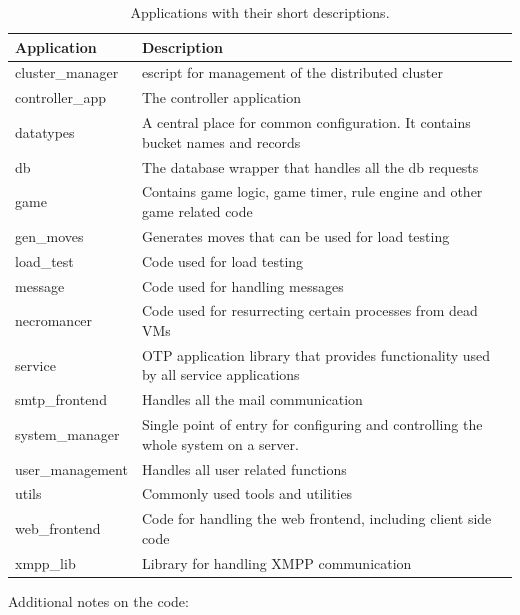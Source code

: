 \documentclass[11pt,a4paper]{report}
\begin{document}
\begin{center}
    \begin{table}[t]
    \centering
    \begin{tabular}{ | l |p{10cm}|}
    \hline
    \textbf{Application} & \textbf{Description} \\ \hline \hline
    cluster\_manager & escript for management of the distributed
    cluster \\ \hline
    controller\_app & The controller application \\ \hline
    datatypes & A central place for common configuration. It contains bucket
    names and records \\ \hline
    db & The database wrapper that handles all the db requests\\ \hline
    game & Contains game logic, game timer, rule engine and other game
    related code \\ \hline
    gen\_moves & Generates moves that can be used for load testing \\ \hline
    load\_test & Code used for load testing \\ \hline
    message & Code used for handling messages \\ \hline
    necromancer & Code used for resurrecting certain processes from dead VMs \\ \hline
    service &  OTP application library that provides functionality used by
    all service applications \\ \hline
    smtp\_frontend & Handles all the mail communication \\ \hline
    system\_manager & Single point of entry for configuring and controlling
    the whole system on a server. \\ \hline
    user\_management & Handles all user related functions \\ \hline
    utils & Commonly used tools and utilities \\ \hline
    web\_frontend & Code for handling the web frontend, including client
    side code \\ \hline
    xmpp\_lib & Library for handling XMPP communication \\ \hline
    \end{tabular}
    \caption{Applications with their short descriptions.}
    \label{table1}
    \end{table}
\end{center}


Additional notes on the code:
\end{document}
